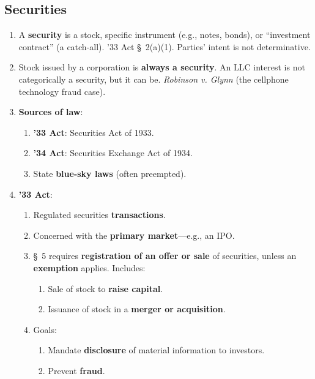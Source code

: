 


\newpage

\subsection{Securities}

\begin{enumerate}
    \item A \textbf{security} is a stock, specific instrument (e.g., notes, 
    bonds), or ``investment contract'' (a catch-all). '33 Act \S\ 2(a)(1). 
    Parties' intent is not determinative.
    \item Stock issued by a corporation is \textbf{always a security}. An LLC 
    interest is not categorically a security, but it can be. \emph{Robinson v. 
    Glynn} (the cellphone technology fraud case). %
    \item \textbf{Sources of law}:
    \begin{enumerate}
        \item \textbf{'33 Act}: Securities Act of 1933.
        \item \textbf{'34 Act}: Securities Exchange Act of 1934.
        \item State \textbf{blue-sky laws} (often preempted).
    \end{enumerate}
    \item \textbf{'33 Act}:
    \begin{enumerate}
        \item Regulated securities \textbf{transactions}.
        \item Concerned with the \textbf{primary market}---e.g., an IPO.
        \item \S\ 5 requires \textbf{registration of an offer or sale} of 
        securities, unless an \textbf{exemption} applies. Includes:
        \begin{enumerate}
            \item Sale of stock to \textbf{raise capital}.
            \item Issuance of stock in a \textbf{merger or acquisition}.
        \end{enumerate}
        \item Goals:
        \begin{enumerate}
            \item Mandate \textbf{disclosure} of material information to 
            investors.
            \item Prevent \textbf{fraud}.

\end{enumerate}
\end{enumerate}
\end{enumerate}
